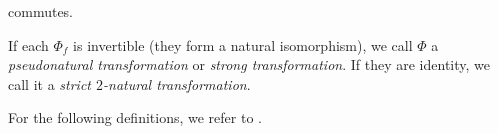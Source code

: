 \begin{definition}
\begin{enumerate}[label=$\bullet$, leftmargin=4\parindent]
\begin{center}
\end{center}
commutes.
\end{enumerate}
\noindent If each $\Phi_f$ is invertible (they form a natural isomorphism), we call $\Phi$ a {\em pseudonatural transformation} or {\em strong transformation}. If they are identity, we call it a {\em strict $2$-natural transformation}.\\
\end{definition}
\newpage

\noindent For the following definitions, we refer to \cite{Lei98}.\\


